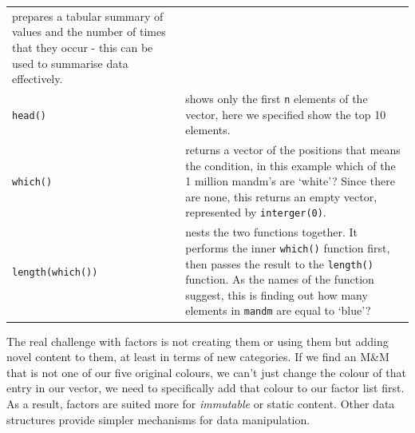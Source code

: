 \documentclass[a4paper]{book}
\begin{document}
\begin{longtable}[]{@{}ll@{}}
\begin{minipage}[t]{0.73\columnwidth}
prepares a tabular summary of values and the number of times that they
occur - this can be used to summarise data effectively.\strut
\end{minipage}\tabularnewline
\begin{minipage}[t]{0.21\columnwidth}\raggedright\strut
\texttt{head()}\strut
\end{minipage} & \begin{minipage}[t]{0.73\columnwidth}\raggedright\strut
shows only the first \texttt{n} elements of the vector, here we
specified show the top 10 elements.\strut
\end{minipage}\tabularnewline
\begin{minipage}[t]{0.21\columnwidth}\raggedright\strut
\texttt{which()}\strut
\end{minipage} & \begin{minipage}[t]{0.73\columnwidth}\raggedright\strut
returns a vector of the positions that means the condition, in this
example which of the 1 million mandm's are `white'? Since there are
none, this returns an empty vector, represented by
\texttt{interger(0)}.\strut
\end{minipage}\tabularnewline
\begin{minipage}[t]{0.21\columnwidth}\raggedright\strut
\texttt{length(which())}\strut
\end{minipage} & \begin{minipage}[t]{0.73\columnwidth}\raggedright\strut
nests the two functions together. It performs the inner \texttt{which()}
function first, then passes the result to the \texttt{length()}
function. As the names of the function suggest, this is finding out how
many elements in \texttt{mandm} are equal to `blue'?\strut
\end{minipage}\tabularnewline
\bottomrule
\end{longtable}

The real challenge with factors is not creating them or using them but
adding novel content to them, at least in terms of new categories. If we
find an M\&M that is not one of our five original colours, we can't just
change the colour of that entry in our vector, we need to specifically
add that colour to our factor list first. As a result, factors are
suited more for \emph{immutable} or static content. Other data
structures provide simpler mechanisms for data manipulation.
\end{document}
